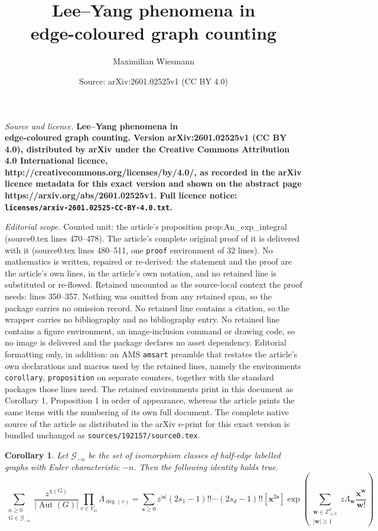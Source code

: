 \documentclass[10pt,a4paper]{amsart}
\title{\bf Lee--Yang phenomena in \\edge-coloured graph counting}
\author{Maximilian Wiesmann}
\date{Source: arXiv:2601.02525v1 (CC BY 4.0)}
\newtheorem{corollary}{Corollary}
\DeclareMathOperator{\Aut}{Aut}
\newcommand{\GG}{\mathcal{G}}
\newcommand{\ZZ}{\mathbb{Z}}
\newcommand{\bb}[1]{\boldsymbol{#1}}
\begin{document}
\maketitle

\noindent\emph{Source and licence.} \bf Lee--Yang phenomena in \\edge-coloured graph counting. Version arXiv:2601.02525v1 (CC BY 4.0), distributed by arXiv under the Creative Commons Attribution 4.0 International licence, http://creativecommons.org/licenses/by/4.0/, as recorded in the arXiv licence metadata for this exact version and shown on the abstract page https://arxiv.org/abs/2601.02525v1. Full licence notice: \texttt{licenses/arxiv-2601.02525-CC-BY-4.0.txt}.\par\smallskip

\noindent\textit{Editorial scope.} Counted unit: the article's proposition prop:An\_exp\_integral (source0.tex lines 470--478). The article's complete original proof of it is delivered with it (source0.tex lines 480--511, one \texttt{proof} environment of 32 lines). No mathematics is written, repaired or re-derived: the statement and the proof are the article's own lines, in the article's own notation, and no retained line is substituted or re-flowed.  Retained uncounted as the source-local context the proof needs: lines 350--357.  Nothing was omitted from any retained span, so the package carries no omission record.  No retained line contains a citation, so the wrapper carries no bibliography and no bibliography entry.  No retained line contains a figure environment, an image-inclusion command or drawing code, so no image is delivered and the package declares no asset dependency.  Editorial formatting only, in addition: an AMS \texttt{amsart} preamble that restates the article's own declarations and macros used by the retained lines, namely the environments \texttt{corollary}, \texttt{proposition} on separate counters, together with the standard packages those lines need.  The retained environments print in this document as Corollary 1, Proposition 1 in order of appearance, whereas the article prints the same items with the numbering of its own full document.  The complete native source of the article as distributed in the arXiv e-print for this exact version is bundled unchanged as \texttt{sources/192157/source0.tex}.
\begin{corollary}
    \label{cor:gen_fun}
    Let $\GG_{-n}$ be the set of isomorphism classes of half-edge labelled graphs with Euler characteristic $-n$. Then the following identity holds true.
    \begin{equation}
    \label{eq:gen_fun_euler}
    \sum_{\substack{n\geq 0\\ G \in \GG_{-n}}} \frac{z^{\chi(G)}}{|\Aut(G)|}\prod_{v\in V_G} \Lambda_{\deg(v)} =  \sum_{\bb{s} \geq 0} z^{|\bb{s}|} (2s_1-1)!!\cdots (2s_d-1)!! [\bb{x}^{2\bb{s}}]\exp\left( \sum_{\substack{\bb{w}\in \ZZ^d_{\geq 0}\\ |\bb{w}| \geq 1}} z\Lambda_{\bb{w}} \frac{\bb{x}^{\bb{w}}}{\bb{w}!} \right)
  \end{equation}  
\end{corollary}
\end{document}
